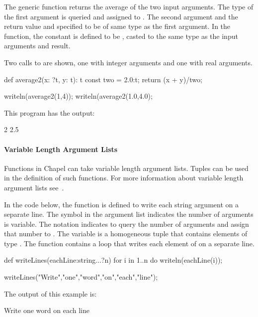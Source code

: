 \begin{example}
The generic function  returns the average of the
two input arguments.  The type of the first argument  is
queried and assigned to .  The second argument 
and the return value and specified to be of same type as the first
argument.  In the function, the constant  is defined to
be , casted to the same type as the input arguments and result.

Two calls to  are shown, one with integer arguments and one
with real arguments.  
\begin{chapel}
def average2(x: ?t, y: t): t {
  const two = 2.0:t;
  return (x + y)/two;
}

writeln(average2(1,4));
writeln(average2(1.0,4.0);
\end{chapel}

This program has the output:
\begin{commandline}
2
2.5
\end{commandline}
\end{example}

\paragraph{Variable Length Argument Lists}
Functions in Chapel can take variable length argument lists.
Tuples can be used in the definition of such functions.
For more information about variable length argument lists 
see~.

\begin{example}
In the code below, 
the function  is defined to write each string
argument on a separate line.  The symbol  in the argument
list indicates the number of arguments is variable.  The notation  
indicates to query the number of arguments and assign that number
to .  The variable  is a homogeneous tuple
that contains  elements of type .  The
function contains a  loop that writes each element of
 on a separate line.

\begin{chapel}
def writeLines(eachLine:string...?n) {
  for i in 1..n do 
    writeln(eachLine(i));
}

writeLines("Write","one","word","on","each","line"); 
\end{chapel}

The output of this example is:
\begin{commandline}
Write
one
word
on
each
line
\end{commandline}
\end{example}



